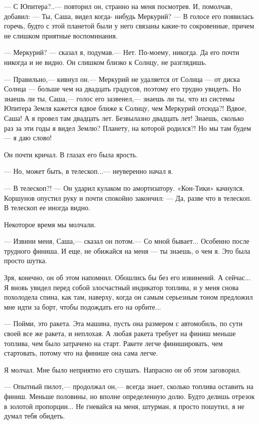 \documentclass[11pt,a4paper,oneside]{article}
\begin{document}
— С Юпитера?..— повторил он, странно на меня посмотрев. И, помолчав, добавил: — Ты, Саша, видел когда- нибудь Меркурий? — В голосе его появилась горечь, будто с этой планетой были у него связаны какие-то сокровенные, причем не слишком приятные воспоминания.

— Меркурий? — сказал я, подумав.— Нет. По-моему, никогда. Да его почти никогда и не видно. Он слишком близко к Солнцу, не разглядишь.

— Правильно,— кивнул он.— Меркурий не удаляется от Солнца — от диска Солнца — больше чем на двадцать градусов, поэтому его трудно увидеть. Но знаешь ли ты, Саша,— голос его зазвенел,— знаешь ли ты, что из системы Юпитера Земля кажется вдвое ближе к Солнцу, чем Меркурий отсюда?! Вдвое, Саша! А я провел там двадцать лет. Безвылазно двадцать лет! Знаешь, сколько раз за эти годы я видел Землю? Планету, на которой родился?! Но мы там будем — я даю слово!

Он почти кричал. В глазах его была ярость.

— Но, может быть, в телескоп...— неуверенно начал я.

— В телескоп?! — Он ударил кулаком по амортизатору. «Кон-Тики» качнулся. Коршунов опустил руку и почти спокойно закончил: — Да, разве что в телескоп. В телескоп ее иногда видно.

Некоторое время мы молчали.

— Извини меня, Саша,— сказал он потом.— Со мной бывает... Особенно после трудного финиша. И еще, не обижайся на меня — ты знаешь, о чем я. Это была просто шутка.

Зря, конечно, он об этом напомнил. Обошлись бы без его извинений. А сейчас... Я вновь увидел перед собой злосчастный индикатор топлива, и у меня снова похолодела спина, как там, наверху, когда он самым серьезным тоном предложил мне идти за борт, чтобы подождать его на орбите...

— Пойми, это ракета. Эта машина, пусть она размером с автомобиль, по сути своей все же ракета, и неплохая. А любая ракета требует на финиш меньше топлива, чем было затрачено на старт. Ракете легче финишировать, чем стартовать, потому что на финише она сама легче.

Я молчал. Мне было неприятно его слушать. Напрасно он об этом заговорил.

— Опытный пилот,— продолжал он,— всегда знает, сколько топлива оставить на финиш. Меньше половины, но вполне определенную долю. Будто делишь отрезок в золотой пропорции... Не гневайся на меня, штурман, я просто пошутил, я не думал тебя обидеть.
\end{document}
